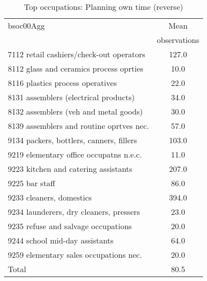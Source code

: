 \begin{table}
	\centering
	\caption{Top occupations: Planning own time (reverse)}
	\begin{tabular}{lc}
	\toprule	
		
bsoc00Agg&Mean \\
&observations \\
\hline
7112 retail cashiers/check-out operators&127.0 \\
8112 glass and ceramics process oprties&10.0 \\
8116 plastics process operatives&22.0 \\
8131 assemblers (electrical products)&34.0 \\
8132 assemblers (veh and metal goods)&30.0 \\
8139 assemblers and routine oprtves nec.&57.0 \\
9134 packers, bottlers, canners, fillers&103.0 \\
9219 elementary office occupatns n.e.c.&11.0 \\
9223 kitchen and catering assistants&207.0 \\
9225 bar staff&86.0 \\
9233 cleaners, domestics&394.0 \\
9234 launderers, dry cleaners, pressers&23.0 \\
9235 refuse and salvage occupations&20.0 \\
9244 school mid-day assistants&64.0 \\
9259 elementary sales occupations nec.&20.0 \\
Total&80.5 \\
\bottomrule
\bottomrule
\end{tabular}
\end{table}
